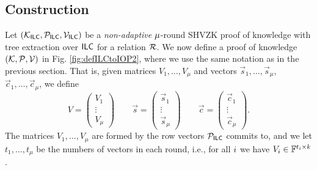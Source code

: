 
\subsection{Construction}\label{ssec:constrILCtoIOP2}
Let $(\mathcal{K}_{\mathsf{ILC}},\mathcal{P}_{\mathsf{ILC}},\mathcal{V}_{\mathsf{ILC}})$ be a {\em non-adaptive} $\mu$-round SHVZK proof of knowledge with tree extraction over $\mathsf{ILC}$ for a relation $\mathcal{R}$.    
We now define a proof of knowledge $(\mathcal{K},\mathcal{P},\mathcal{V})$ in Fig. \ref{fig:defILCtoIOP2}, where we use the same notation as in the previous section. That is, given matrices $V_1,\dots, V_\mu$ and vectors $\vec{s}_1,\dots, \vec{s}_\mu$, $\vec{c}_1,\dots, \vec{c}_\mu$, we define $$V=\left(\begin{matrix}V_1\\ \vdots \\ V_\mu\end{matrix}\right) \qquad \vec{s}=\left(\begin{matrix}\vec{s}_1\\ \vdots \\ \vec{s}_\mu\end{matrix}\right) \qquad \vec{c}=\left(\begin{matrix}\vec{c}_1\\ \vdots \\ \vec{c}_\mu\end{matrix}\right).$$ 
The matrices $V_1,\ldots,V_\mu$ are formed by the row vectors $\mathcal{P}_{\mathsf{ILC}}$ commits to, and we let $t_1,\ldots,t_\mu$ be the numbers of vectors in each round, i.e., for all $i$ we have $V_i\in \mathbb{F}^{t_i \times k}$.

